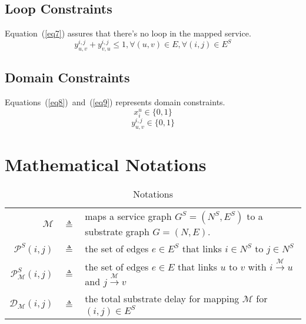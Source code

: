 \begin{appendices}
\subsection{Loop Constraints}
Equation~(\ref{eq7}) assures that there's no loop in the mapped service.
\begin{equation}\label{eq7}
y_{u,v}^{i,j}+y_{v,u}^{i,j} \leq 1, \forall (u,v) \in E, \forall (i,j) \in E^{S}
\end{equation}


\subsection{Domain Constraints}
Equations~(\ref{eq8})~and~(\ref{eq9}) represents domain constraints.
\begin{equation}\label{eq8}
x_{i}^{u}\in\{0,1\}
\end{equation}
\begin{equation}\label{eq9}
y_{u,v}^{i,j}\in\{0,1\}
\end{equation}


\section{Mathematical Notations}
  
\begin{table}[htbp]\caption{Notations}
\begin{center}%
\begin{tabular}{r c p{12cm} }
\toprule{}

$\mathscr{M}$ & $\triangleq$ & maps a service graph $G^{S}=(N^{S},E^{S})$ to a substrate graph $G=(N,E)$.\\
$\mathscr{P}^{S}(i,j)$ & $\triangleq$ & the set of edges $e\in E^{S}$ that links $i \in N^{S}$ to $j \in N^{S}$\\
$\mathscr{P}^{S}_{\mathscr{M}}(i,j)$ & $\triangleq$ & the set of edges $e\in E$ that links $u$ to $v$ with $i \xrightarrow{\mathscr{M}} u$ and $j \xrightarrow{\mathscr{M}} v$\\
$\mathscr{D}_{\mathscr{M}}(i,j)$ & $\triangleq$ & the total substrate delay for mapping $\mathscr{M}$ for $(i,j) \in E^{S}$ \\


\end{tabular}
\end{center}
\end{table}
\end{appendices}

